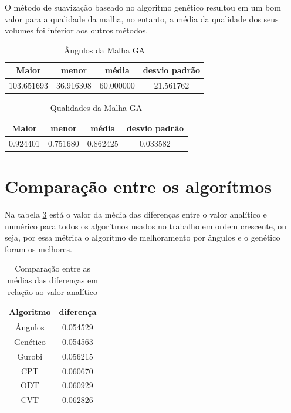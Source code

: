 O método de suavização baseado no algoritmo genético resultou em um bom valor para a qualidade da malha, no entanto, a média da qualidade dos seus volumes foi inferior aos outros métodos.

\begin{table}[hb]
\centering
\par\caption{Ângulos da Malha GA}
\begin{tabular}{c|c|c|c}
Maior&menor&média&desvio padrão\\\hline\hline
103.651693&36.916308&60.000000&21.561762\\\hline
\end{tabular}
\label{tab:angulos-malha-ga}
\end{table}

\begin{table}[hb]
\centering
\par\caption{Qualidades da Malha GA}
\begin{tabular}{c|c|c|c}
Maior&menor&média&desvio padrão\\\hline\hline
0.924401&0.751680&0.862425&0.033582\\\hline
\end{tabular}
\label{tab:qualidades-malha-ga}
\end{table}

\section{Comparação entre os algorítmos}

Na tabela \ref{tab:comparacao-analitico} está o valor da média das diferenças entre o valor analítico e numérico para todos os algorítmos usados no trabalho em ordem crescente, ou seja, por essa métrica o algorítmo de melhoramento por ângulos e o genético foram os melhores.

\begin{table}
    \centering
    \par\caption{Comparação entre as médias das diferenças em relação ao valor analítico}
    \begin{tabular}{c|c}
        Algoritmo&diferença\\\hline\hline
        Ângulos  &  0.054529 \\\hline
        Genético &  0.054563 \\\hline
        Gurobi   &  0.056215 \\\hline
        CPT      &  0.060670 \\\hline
        ODT      &  0.060929 \\\hline
        CVT      &  0.062826 \\\hline
    \end{tabular}
    \label{tab:comparacao-analitico}
\end{table}


